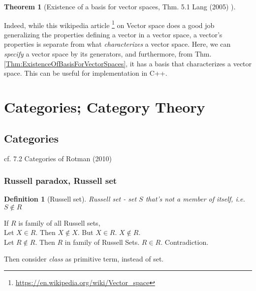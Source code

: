 \documentclass[10pt]{amsart}
\newtheorem{theorem}{Theorem}
\newtheorem{definition}{Definition}
\begin{document}
\begin{multicols*}{2}
\begin{theorem}[Existence of a basis for vector spaces, Thm. 5.1 Lang (2005) \cite{Lang2005}]
\end{theorem}
	
Indeed, while this wikipedia article \footnote{\url{https://en.wikipedia.org/wiki/Vector_space}} on Vector space does a good job generalizing the properties defining a vector in a vector space, a vector's properties is separate from what \emph{characterizes} a vector space. Here, we can \emph{specify} a vector space by its generators, and furthermore, from Thm. \ref{Thm:ExistenceOfBasisForVectorSpaces}, it has a basis that characterizes a vector space. This can be useful for implementation in C++.


\section{Categories; Category Theory}  

\subsection{Categories}

cf. 7.2 Categories of Rotman (2010) \cite{JRotman2010}

\subsubsection{Russell paradox, Russell set}  

\begin{definition}[Russell set]
Russell set  - set $S$ that's not a member of itself, i.e. $S\notin R$
\end{definition}

If $R$ is family of all Russell sets,  \\
Let $X\in R$.  Then $X\notin X$.  But $X\in R$.  $X\notin R$.  \\
Let $R\notin R$.  Then $R$ in family of Russell Sets.  $R\in R$.  Contradiction.  

Then consider \emph{class} as primitive term, instead of set.  


\end{multicols*}
\end{document}
